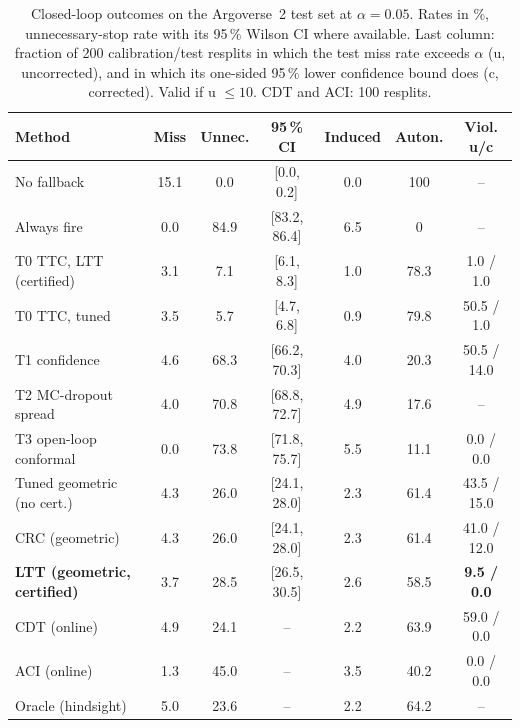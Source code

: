 \documentclass[lettersize,journal]{IEEEtran}
\begin{document}
\begin{table}[t]
\caption{Closed-loop outcomes on the Argoverse~2 test set at
$\alpha = 0.05$. Rates in \%, unnecessary-stop rate with its 95\,\%
Wilson CI where available. Last column: fraction of 200
calibration/test resplits in which the test miss rate exceeds $\alpha$
(u, uncorrected), and in which its one-sided 95\,\% lower confidence bound
does (c, corrected). Valid if u $\le 10$. CDT and ACI: 100 resplits.}
\label{tab:main}
\centering
\scriptsize\setlength{\tabcolsep}{2.4pt}
\begin{tabular}{lcccccc}
\toprule
Method & Miss & Unnec. & 95\,\% CI & Induced & Auton. & Viol. u/c \\
\midrule
No fallback & 15.1 & 0.0 & [0.0, 0.2] & 0.0 & 100 & -- \\
Always fire & 0.0 & 84.9 & [83.2, 86.4] & 6.5 & 0 & -- \\
T0 TTC, LTT (certified) & 3.1 & 7.1 & [6.1, 8.3] & 1.0 & 78.3 & 1.0 / 1.0 \\
T0 TTC, tuned & 3.5 & 5.7 & [4.7, 6.8] & 0.9 & 79.8 & 50.5 / 1.0 \\
T1 confidence & 4.6 & 68.3 & [66.2, 70.3] & 4.0 & 20.3 & 50.5 / 14.0 \\
T2 MC-dropout spread & 4.0 & 70.8 & [68.8, 72.7] & 4.9 & 17.6 & -- \\
T3 open-loop conformal & 0.0 & 73.8 & [71.8, 75.7] & 5.5 & 11.1 & 0.0 / 0.0 \\
Tuned geometric (no cert.) & 4.3 & 26.0 & [24.1, 28.0] & 2.3 & 61.4 & 43.5 / 15.0 \\
CRC (geometric) & 4.3 & 26.0 & [24.1, 28.0] & 2.3 & 61.4 & 41.0 / 12.0 \\
\textbf{LTT (geometric, certified)} & 3.7 & 28.5 & [26.5, 30.5] & 2.6 & 58.5 & \textbf{9.5 / 0.0} \\
CDT (online) & 4.9 & 24.1 & -- & 2.2 & 63.9 & 59.0 / 0.0 \\
ACI (online) & 1.3 & 45.0 & -- & 3.5 & 40.2 & 0.0 / 0.0 \\
Oracle (hindsight) & 5.0 & 23.6 & -- & 2.2 & 64.2 & -- \\
\bottomrule
\end{tabular}
\end{table}
\end{document}
